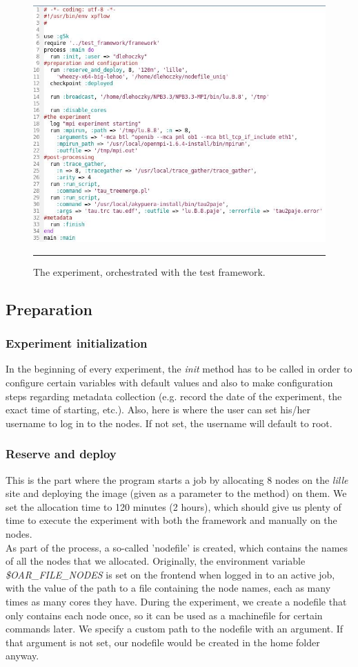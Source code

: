 \begin{figure}[htbp]
  \centering
    \includegraphics[scale=0.7]{./Figures/experiment_code.jpg}
    \rule{35em}{0.5pt}
  \caption[Experiment code]{The experiment, orchestrated with the test
    framework.}
  \label{fig:experiment_code}
\end{figure}

\subsection{Preparation}
\subsubsection{Experiment initialization}
In the beginning of every experiment, the \emph{init} method has to be
called in order to configure certain variables with default values and
also to make configuration steps regarding metadata collection
(e.g. record the date of the experiment, the exact time of starting,
etc.). Also, here is where the user can set his/her username to log in
to the nodes. If not set, the username will default to root.
\subsubsection{Reserve and deploy}
This is the part where the program starts a job by allocating 8 nodes
on the \emph{lille} site and deploying the image (given as a parameter
to the method) on them. We set the allocation time to 120 minutes (2
hours), which should give us plenty of time to execute the experiment
with both the framework and manually on the nodes.\\
As part of the process, a so-called 'nodefile' is created, which
contains the names of all the nodes that we allocated. Originally, the
environment variable \emph{\$OAR\_FILE\_NODES} is set on the frontend
when logged in to an active job, with the value of the path to a file
containing the node names, each as many times as many cores they
have. During the experiment, we create a nodefile that only contains
each node once, so it can be used as a machinefile for certain
commands later. We specify a custom path to the nodefile with an
argument. If that argument is not set, our nodefile would be created
in the home folder anyway.
